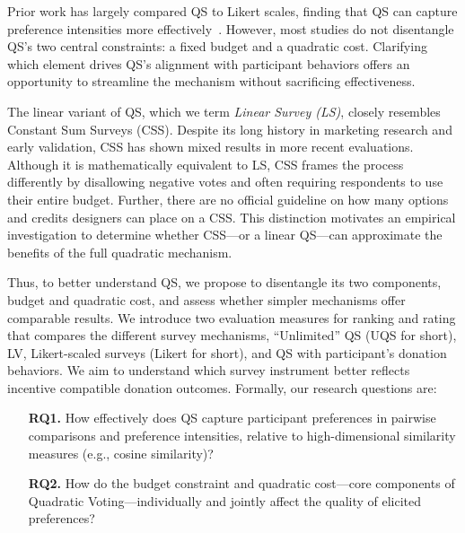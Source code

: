 
Prior work has largely compared QS to Likert scales, finding that QS can capture preference intensities more effectively~\cite{quarfoot2017quadratic,naylor2017first,chengCanShowWhat2021,cavaille2024cares}. However, most studies do not disentangle QS's two central constraints: a fixed budget and a quadratic cost. Clarifying which element drives QS's alignment with participant behaviors offers an opportunity to streamline the mechanism without sacrificing effectiveness.


The linear variant of QS, which we term \emph{Linear Survey (LS)}, closely resembles Constant Sum Surveys (CSS)\cite{metfesselProposalQuantitativeReporting1947}. Despite its long history in marketing research and early validation, CSS has shown mixed results in more recent evaluations\cite{}. Although it is mathematically equivalent to LS, CSS frames the process differently by disallowing negative votes and often requiring respondents to use their entire budget. Further, there are no official guideline on how many options and credits designers can place on a CSS. This distinction motivates an empirical investigation to determine whether CSS---or a linear QS---can approximate the benefits of the full quadratic mechanism.


Thus, to better understand QS, we propose to disentangle its two components, budget and quadratic cost, and assess whether simpler mechanisms offer comparable results. We introduce two evaluation measures for ranking and rating that compares the different survey mechanisms, ``Unlimited'' QS (UQS for short), LV, Likert-scaled surveys (Likert for short), and QS with participant's donation behaviors. We aim to understand which survey instrument better reflects incentive compatible donation outcomes. Formally, our research questions are:

\begin{itemize}
    \item [\textbf{RQ1.}] How effectively does QS capture participant preferences in pairwise comparisons and preference intensities, relative to high-dimensional similarity measures (e.g., cosine similarity)?
    \item [\textbf{RQ2.}] How do the budget constraint and quadratic cost—core components of Quadratic Voting—individually and jointly affect the quality of elicited preferences?
\end{itemize}

